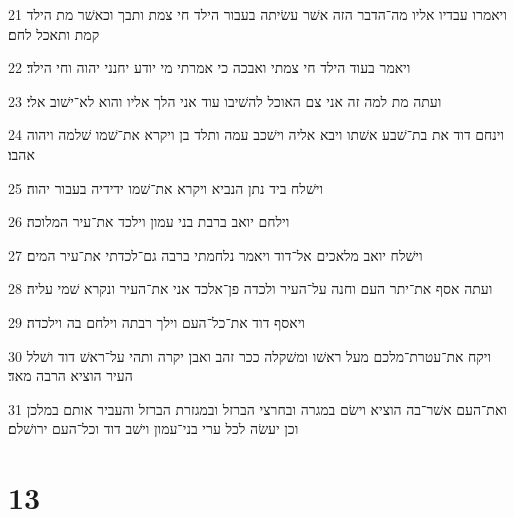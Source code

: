 \par 21 ויאמרו עבדיו אליו מה־הדבר הזה אשׁר עשׂיתה בעבור הילד חי צמת ותבך וכאשׁר מת הילד קמת ותאכל לחם׃
\par 22 ויאמר בעוד הילד חי צמתי ואבכה כי אמרתי מי יודע יחנני יהוה וחי הילד׃
\par 23 ועתה מת למה זה אני צם האוכל להשׁיבו עוד אני הלך אליו והוא לא־ישׁוב אלי׃
\par 24 וינחם דוד את בת־שׁבע אשׁתו ויבא אליה וישׁכב עמה ותלד בן ויקרא את־שׁמו שׁלמה ויהוה אהבו׃
\par 25 וישׁלח ביד נתן הנביא ויקרא את־שׁמו ידידיה בעבור יהוה׃
\par 26 וילחם יואב ברבת בני עמון וילכד את־עיר המלוכה׃
\par 27 וישׁלח יואב מלאכים אל־דוד ויאמר נלחמתי ברבה גם־לכדתי את־עיר המים׃
\par 28 ועתה אסף את־יתר העם וחנה על־העיר ולכדה פן־אלכד אני את־העיר ונקרא שׁמי עליה׃
\par 29 ויאסף דוד את־כל־העם וילך רבתה וילחם בה וילכדה׃
\par 30 ויקח את־עטרת־מלכם מעל ראשׁו ומשׁקלה ככר זהב ואבן יקרה ותהי על־ראשׁ דוד ושׁלל העיר הוציא הרבה מאד׃
\par 31 ואת־העם אשׁר־בה הוציא וישׂם במגרה ובחרצי הברזל ובמגזרת הברזל והעביר אותם במלכן וכן יעשׂה לכל ערי בני־עמון וישׁב דוד וכל־העם ירושׁלם׃

\chapter{13}

